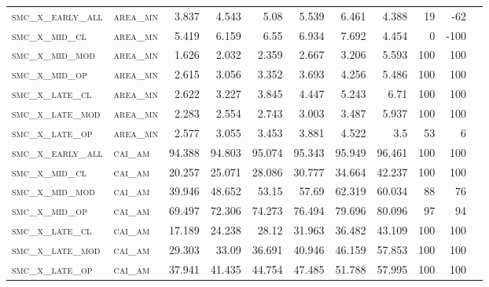 \begin{landscape}
\begin{center}
\begin{footnotesize}
\begin{longtable}{llrrrrrr|rrr}
\textsc{smc\_x\_early\_all} & \textsc{area\_mn  }   & 3.837      & 4.543      & 5.08       & 5.539      & 6.461      & 4.388      & 19    & -62    \\
\textsc{smc\_x\_mid\_cl   } & \textsc{area\_mn  }   & 5.419      & 6.159      & 6.55       & 6.934      & 7.692      & 4.454      & 0     & -100   \\
\textsc{smc\_x\_mid\_mod  } & \textsc{area\_mn  }   & 1.626      & 2.032      & 2.359      & 2.667      & 3.206      & 5.593      & 100   & 100    \\
\textsc{smc\_x\_mid\_op   } & \textsc{area\_mn  }   & 2.615      & 3.056      & 3.352      & 3.693      & 4.256      & 5.486      & 100   & 100    \\
\textsc{smc\_x\_late\_cl  } & \textsc{area\_mn  }   & 2.622      & 3.227      & 3.845      & 4.447      & 5.243      & 6.71       & 100   & 100    \\
\textsc{smc\_x\_late\_mod } & \textsc{area\_mn  }   & 2.283      & 2.554      & 2.743      & 3.003      & 3.487      & 5.937      & 100   & 100    \\
\textsc{smc\_x\_late\_op  } & \textsc{area\_mn  }   & 2.577      & 3.055      & 3.453      & 3.881      & 4.522      & 3.5        & 53    & 6      \\
\textsc{smc\_x\_early\_all} & \textsc{cai\_am   }   & 94.388     & 94.803     & 95.074     & 95.343     & 95.949     & 96.461     & 100   & 100    \\
\textsc{smc\_x\_mid\_cl   } & \textsc{cai\_am   }   & 20.257     & 25.071     & 28.086     & 30.777     & 34.664     & 42.237     & 100   & 100    \\
\textsc{smc\_x\_mid\_mod  } & \textsc{cai\_am   }   & 39.946     & 48.652     & 53.15      & 57.69      & 62.319     & 60.034     & 88    & 76     \\
\textsc{smc\_x\_mid\_op   } & \textsc{cai\_am   }   & 69.497     & 72.306     & 74.273     & 76.494     & 79.696     & 80.096     & 97    & 94     \\
\textsc{smc\_x\_late\_cl  } & \textsc{cai\_am   }   & 17.189     & 24.238     & 28.12      & 31.963     & 36.482     & 43.109     & 100   & 100    \\
\textsc{smc\_x\_late\_mod } & \textsc{cai\_am   }   & 29.303     & 33.09      & 36.691     & 40.946     & 46.159     & 57.853     & 100   & 100    \\
\textsc{smc\_x\_late\_op  } & \textsc{cai\_am   }   & 37.941     & 41.435     & 44.754     & 47.485     & 51.788     & 57.995     & 100   & 100    \\

\end{longtable}
\end{footnotesize}
\end{center}
\end{landscape}
